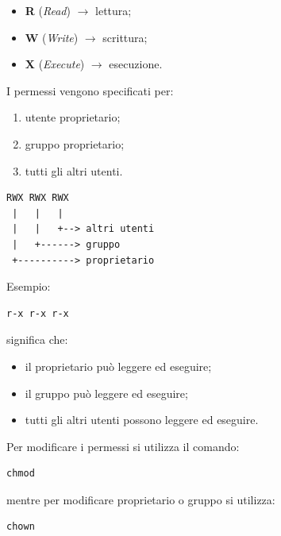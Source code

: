 \begin{itemize}
    \item \textbf{R} (\textit{Read}) $\rightarrow$ lettura;
    
    \item \textbf{W} (\textit{Write}) $\rightarrow$ scrittura;
    
    \item \textbf{X} (\textit{Execute}) $\rightarrow$ esecuzione.
\end{itemize}

\medskip

\noindent I permessi vengono specificati per:

\begin{enumerate}
    \item utente proprietario;
    \item gruppo proprietario;
    \item tutti gli altri utenti.
\end{enumerate}

\begin{verbatim}
RWX RWX RWX
 |   |   |
 |   |   +--> altri utenti
 |   +------> gruppo
 +----------> proprietario
\end{verbatim}

\medskip

\noindent Esempio:

\begin{verbatim}
r-x r-x r-x
\end{verbatim}

\noindent
significa che:

\begin{itemize}
    \item il proprietario può leggere ed eseguire;
    
    \item il gruppo può leggere ed eseguire;
    
    \item tutti gli altri utenti possono leggere ed eseguire.
\end{itemize}

\bigskip

\noindent Per modificare i permessi si utilizza il comando:

\begin{verbatim}
chmod
\end{verbatim}

\noindent
mentre per modificare proprietario o gruppo si utilizza:

\begin{verbatim}
chown
\end{verbatim}

